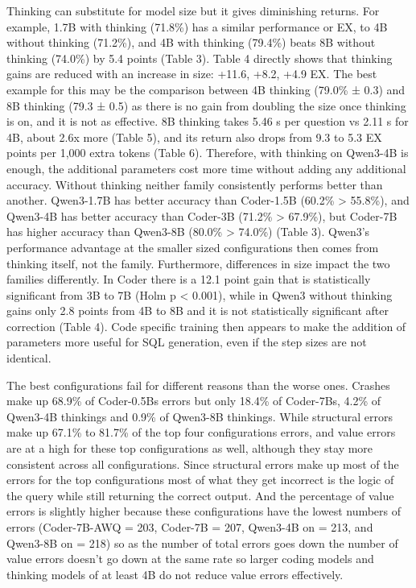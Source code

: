 Thinking can substitute for model size but it gives diminishing returns. For example, 1.7B with thinking (71.8\%) has a similar performance or EX, to 4B without thinking (71.2\%), and 4B with thinking (79.4\%) beats 8B without thinking (74.0\%) by 5.4 points (Table 3). Table 4 directly shows that thinking gains are reduced with an increase in size: +11.6, +8.2, +4.9 EX. The best example for this may be the comparison between 4B thinking (79.0\% ± 0.3) and 8B thinking (79.3 ± 0.5) as there is no gain from doubling the size once thinking is on, and it is not as effective. 8B thinking takes 5.46 s per question vs 2.11 s for 4B, about 2.6x more (Table 5), and its return also drops from 9.3 to 5.3 EX points per 1,000 extra tokens (Table 6). Therefore, with thinking on Qwen3-4B is enough, the additional parameters cost more time without adding any additional accuracy. Without thinking neither family consistently performs better than another. Qwen3-1.7B has better accuracy than Coder-1.5B (60.2\% \textgreater{} 55.8\%), and Qwen3-4B has better accuracy than Coder-3B (71.2\% \textgreater{} 67.9\%), but Coder-7B has higher accuracy than Qwen3-8B (80.0\% \textgreater{} 74.0\%) (Table 3). Qwen3's performance advantage at the smaller sized configurations then comes from thinking itself, not the family. Furthermore, differences in size impact the two families differently. In Coder there is a 12.1 point gain that is statistically significant from 3B to 7B (Holm p \textless{} 0.001), while in Qwen3 without thinking gains only 2.8 points from 4B to 8B and it is not statistically significant after correction (Table 4). Code specific training then appears to make the addition of parameters more useful for SQL generation, even if the step sizes are not identical.

The best configurations fail for different reasons than the worse ones. Crashes make up 68.9\% of Coder-0.5B\textquotesingle s errors but only 18.4\% of Coder-7B\textquotesingle s, 4.2\% of Qwen3-4B thinking\textquotesingle s and 0.9\% of Qwen3-8B thinking\textquotesingle s. While structural errors make up 67.1\% to 81.7\% of the top four configurations\textquotesingle{} errors, and value errors are at a high for these top configurations as well, although they stay more consistent across all configurations. Since structural errors make up most of the errors for the top configurations most of what they get incorrect is the logic of the query while still returning the correct output. And the percentage of value errors is slightly higher because these configurations have the lowest numbers of errors (Coder-7B-AWQ = 203, Coder-7B = 207, Qwen3-4B on = 213, and Qwen3-8B on = 218) so as the number of total errors goes down the number of value errors doesn't go down at the same rate so larger coding models and thinking models of at least 4B do not reduce value errors effectively.

